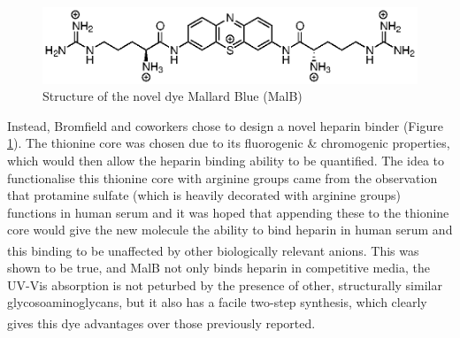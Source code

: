 \begin{figure} [h!]
\centering
\includegraphics{Mallard_Blue/Mallard_blue.eps}
\caption{Structure of the novel dye Mallard Blue (MalB)}
\label{Mallard_Blue}
\end{figure}
Instead, Bromfield and coworkers chose to design a novel heparin binder (Figure \ref{Mallard_Blue}).  
The thionine core was chosen due to its fluorogenic \& chromogenic properties, which would then allow the heparin binding ability to be quantified.  The idea to functionalise this thionine core with arginine groups came from the observation that protamine sulfate (which is heavily decorated with arginine groups) functions in human serum and it was hoped that appending these to the thionine core would give the new molecule the ability to bind heparin in human serum and this binding to be unaffected by other biologically relevant anions.\textsuperscript{\cite{Bromfield2014MultivalentSensing}} This was shown to be true, and MalB not only binds heparin in competitive media, the UV-Vis absorption is not peturbed by the presence of other, structurally similar glycosoaminoglycans, but it also has a facile two-step synthesis, which clearly gives this dye advantages over those previously reported.\textsuperscript{\cite{Bromfield2014MultivalentSensing, Bromfield2013ADendrimers.}} 

